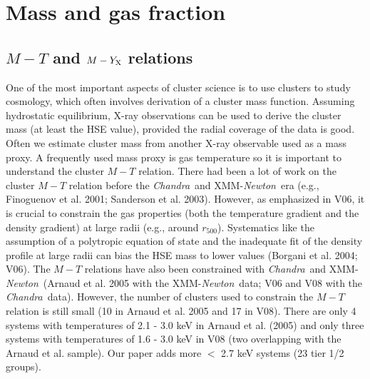 \documentclass{aastex}
\def\chandra    {{\em Chandra}\/}
\def\xmm        {XMM-{\em Newton}\/}
\begin{document}
\section{Mass and gas fraction}

\subsection{$M - T$ and $M - Y_{\rm X}$ relations}

One of the most important aspects of cluster science is to use clusters to study cosmology,
which often involves derivation of a cluster mass function. Assuming hydrostatic equilibrium,
X-ray observations can be used to derive the cluster mass (at least the HSE value),
provided the radial coverage of the data is good. Often we estimate cluster mass from 
another X-ray observable used as a mass proxy. A frequently used
mass proxy is gas temperature so it is important
to understand the cluster $M - T$ relation. There had been a lot of work on the
cluster $M - T$ relation before the \chandra\ and \xmm\ era (e.g., Finoguenov et al. 2001;
Sanderson et al. 2003). However, as emphasized in V06, it is crucial to
constrain the gas properties (both the temperature gradient and the density gradient)
at large radii (e.g., around $r_{500}$). Systematics like the assumption of a polytropic
equation of state and the inadequate fit of the density profile at large radii 
can bias the HSE mass to lower values (Borgani et al. 2004; V06).
The $M - T$ relations have also been constrained with \chandra\ and \xmm\ (Arnaud et al.
2005 with the \xmm\ data; V06 and V08 with the \chandra\ data).
However, the number of clusters used to
constrain the $M - T$ relation is still small (10 in Arnaud et al. 2005 and 17 in V08).
There are only 4 systems with temperatures of 2.1 - 3.0 keV
in Arnaud et al. (2005) and only three systems with temperatures of
1.6 - 3.0 keV in V08 (two overlapping with the Arnaud et al. sample).
Our paper adds more $<$ 2.7 keV systems (23 tier 1/2 groups).
\end{document}
